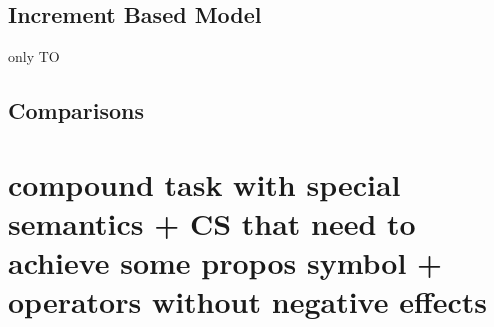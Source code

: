 \subsection{Increment Based Model}
only TO

\subsection{Comparisons}

\section{compound task with special semantics + CS that need to achieve some propos symbol + operators without negative effects}
